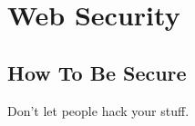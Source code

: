 \section{Web Security}

\subsection{How To Be Secure}

Don't let people hack your stuff. \cite{textbook}
